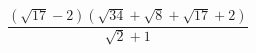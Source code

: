 \begin{ex}[type=calculate]
	\begin{condition}
		\( \dfrac{(\sqrt{17}-2)(\sqrt{34}+\sqrt{8}+\sqrt{17}+2)}{\sqrt{2}+1} \)
	\end{condition}
\end{ex}